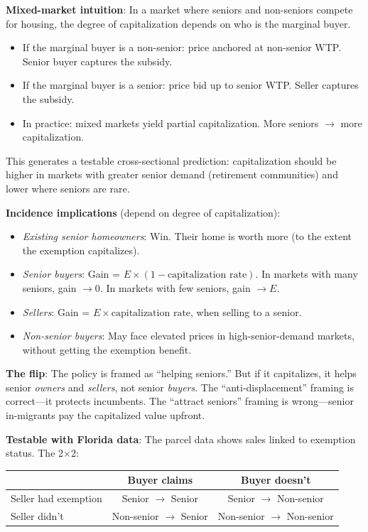\documentclass[11pt]{article}
\begin{document}
\textbf{Mixed-market intuition}: In a market where seniors and non-seniors compete for housing, the degree of capitalization depends on who is the marginal buyer.
\begin{itemize}
    \item If the marginal buyer is a non-senior: price anchored at non-senior WTP. Senior buyer captures the subsidy.
    \item If the marginal buyer is a senior: price bid up to senior WTP. Seller captures the subsidy.
    \item In practice: mixed markets yield partial capitalization. More seniors $\to$ more capitalization.
\end{itemize}

This generates a testable cross-sectional prediction: capitalization should be higher in markets with greater senior demand (retirement communities) and lower where seniors are rare.

\textbf{Incidence implications} (depend on degree of capitalization):
\begin{itemize}
    \item \textit{Existing senior homeowners}: Win. Their home is worth more (to the extent the exemption capitalizes).
    \item \textit{Senior buyers}: Gain = $E \times (1 - \text{capitalization rate})$. In markets with many seniors, gain $\to 0$. In markets with few seniors, gain $\to E$.
    \item \textit{Sellers}: Gain = $E \times \text{capitalization rate}$, when selling to a senior.
    \item \textit{Non-senior buyers}: May face elevated prices in high-senior-demand markets, without getting the exemption benefit.
\end{itemize}

\textbf{The flip}: The policy is framed as ``helping seniors.'' But if it capitalizes, it helps senior \textit{owners} and \textit{sellers}, not senior \textit{buyers}. The ``anti-displacement'' framing is correct---it protects incumbents. The ``attract seniors'' framing is wrong---senior in-migrants pay the capitalized value upfront.

\textbf{Testable with Florida data}: The parcel data shows sales linked to exemption status. The 2$\times$2:

\begin{center}
\begin{tabular}{l|cc}
 & Buyer claims & Buyer doesn't \\
\hline
Seller had exemption & Senior $\to$ Senior & Senior $\to$ Non-senior \\
Seller didn't & Non-senior $\to$ Senior & Non-senior $\to$ Non-senior \\
\end{tabular}
\end{center}
\end{document}
